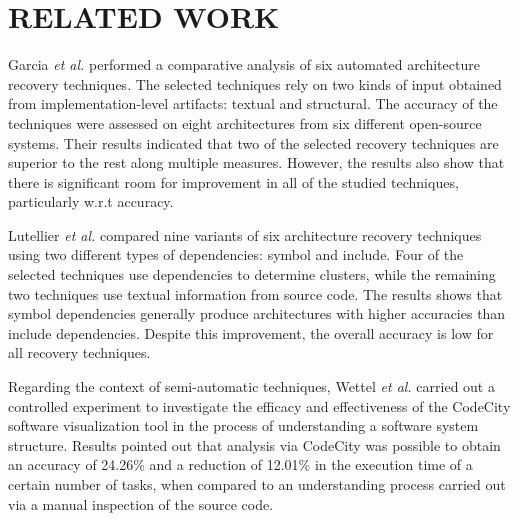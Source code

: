 \section{RELATED WORK}\label{sec:related}


Garcia \textit{et al.} \cite{Garcia:ASE2013} performed a comparative analysis of six automated architecture recovery techniques. The selected techniques rely on two kinds of input obtained from im\-ple\-mentation-level artifacts: textual and structural. The accuracy of the techniques were assessed on eight architectures from six different open-source systems. Their results indicated that two of the selected recovery techniques are superior to the rest along multiple measures. However, the results also show that there is significant room for improvement in all of the studied techniques, particularly w.r.t accuracy.

Lutellier \textit{et al.} \cite{Lutellier_2015} compared nine variants of six architecture recovery techniques using two different types of dependencies: symbol and include. Four of the selected techniques use dependencies to determine clusters, while the remaining two techniques use textual information from source code. The results shows that symbol dependencies generally produce architectures with higher accuracies than include dependencies. Despite this improvement, the overall accuracy is low for all recovery techniques.

Regarding the context of semi-automatic techniques, Wettel \textit{et al.} \cite{wettel_software_2011} carried out a controlled experiment to investigate the efficacy and effectiveness of the CodeCity software visualization tool in the process of understanding a software system structure. Results pointed out that analysis via CodeCity was possible to obtain an accuracy of 24.26\% and a reduction of 12.01\% in the execution time of a certain number of tasks, when compared to an understanding process carried out via a manual inspection of the source code.